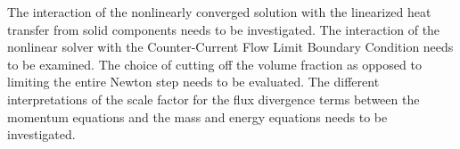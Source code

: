 The interaction of the nonlinearly converged solution with the linearized heat transfer from solid components needs to be investigated.
The interaction of the nonlinear solver with the Counter-Current Flow Limit Boundary Condition needs to be examined.
The choice of cutting off the volume fraction as opposed to limiting the entire Newton step needs to be evaluated.
The different interpretations of the scale factor for the flux divergence terms between the momentum equations and the mass and energy equations needs to be investigated.

